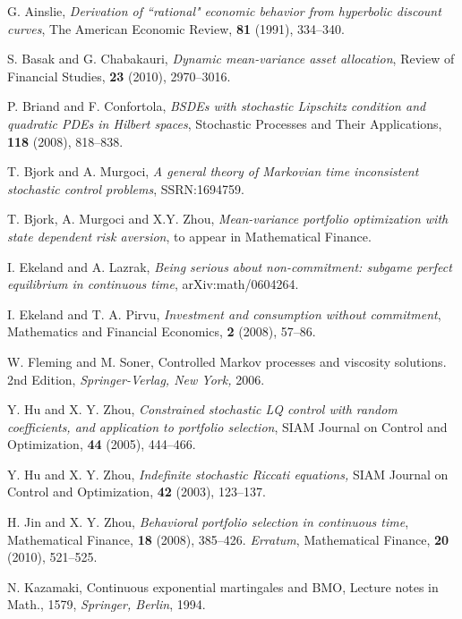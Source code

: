 \documentclass[final]{siamltex}
\begin{document}
\begin{thebibliography}{99}

 {\sc G. Ainslie},  {\it Derivation of ``rational" economic behavior from hyperbolic discount curves}, {The American Economic Review}, {\bf 81} (1991), 334--340.

 {\sc S. Basak and G. Chabakauri}, {\it Dynamic mean-variance asset allocation}, { Review of Financial Studies},
{\bf 23} (2010), 2970--3016.

 {\sc P. Briand and F. Confortola}, {\it BSDEs with stochastic Lipschitz condition and quadratic PDEs in Hilbert spaces},
{Stochastic Processes and Their Applications},  {\bf 118}  (2008),  818--838.

 {\sc T. Bjork and A. Murgoci}, {\it A general theory of Markovian time inconsistent
stochastic control problems}, SSRN:1694759.

 {\sc T. Bjork, A. Murgoci and X.Y. Zhou}, {\it Mean-variance portfolio optimization
with state dependent risk aversion}, to appear in Mathematical Finance.

 {\sc I. Ekeland and A. Lazrak}, {\it Being serious about non-commitment: subgame perfect equilibrium in continuous time}, arXiv:math/0604264.

 {\sc I. Ekeland and T. A. Pirvu}, {\it Investment and consumption without commitment},  {Mathematics and Financial Economics}, {\bf 2}  (2008), 57--86.

 {\sc W. Fleming and M. Soner}, Controlled Markov processes and viscosity solutions. 2nd Edition,  {\it Springer-Verlag, New York,} 2006.

 {\sc Y. Hu and X. Y. Zhou},
{\it Constrained stochastic LQ control with random coefficients, and application to portfolio selection},
{SIAM Journal on Control and Optimization}, {\bf 44} (2005), 444--466.

 {\sc Y. Hu and X. Y. Zhou},
{\it Indefinite stochastic Riccati equations,} {SIAM Journal on Control and Optimization}, {\bf 42} (2003), 123--137.

 {\sc H. Jin  and X. Y. Zhou}, {\it Behavioral portfolio
    selection in continuous time}, {Mathematical Finance}, {\bf 18} (2008),
    385--426. {\it Erratum}, {Mathematical Finance}, {\bf 20} (2010),
    521--525.

{\sc N. Kazamaki},  Continuous exponential martingales and BMO, Lecture notes in Math., 1579, {\it Springer, Berlin}, 1994.


\end{thebibliography}
\end{document}
